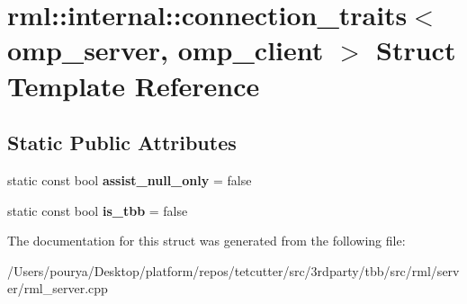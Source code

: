 \hypertarget{structrml_1_1internal_1_1connection__traits_3_01omp__server_00_01omp__client_01_4}{}\section{rml\+:\+:internal\+:\+:connection\+\_\+traits$<$ omp\+\_\+server, omp\+\_\+client $>$ Struct Template Reference}
\label{structrml_1_1internal_1_1connection__traits_3_01omp__server_00_01omp__client_01_4}
\subsection*{Static Public Attributes}
\begin{DoxyCompactItemize}
\item 
\hypertarget{structrml_1_1internal_1_1connection__traits_3_01omp__server_00_01omp__client_01_4_aa5baa889d7a253fbdfdd7ce2304d8530}{}static const bool {\bfseries assist\+\_\+null\+\_\+only} = false\label{structrml_1_1internal_1_1connection__traits_3_01omp__server_00_01omp__client_01_4_aa5baa889d7a253fbdfdd7ce2304d8530}

\item 
\hypertarget{structrml_1_1internal_1_1connection__traits_3_01omp__server_00_01omp__client_01_4_a5ccbeeaa4c57e518c0a3e0d90e79b00f}{}static const bool {\bfseries is\+\_\+tbb} = false\label{structrml_1_1internal_1_1connection__traits_3_01omp__server_00_01omp__client_01_4_a5ccbeeaa4c57e518c0a3e0d90e79b00f}

\end{DoxyCompactItemize}


The documentation for this struct was generated from the following file\+:\begin{DoxyCompactItemize}
\item 
/\+Users/pourya/\+Desktop/platform/repos/tetcutter/src/3rdparty/tbb/src/rml/server/rml\+\_\+server.\+cpp\end{DoxyCompactItemize}
